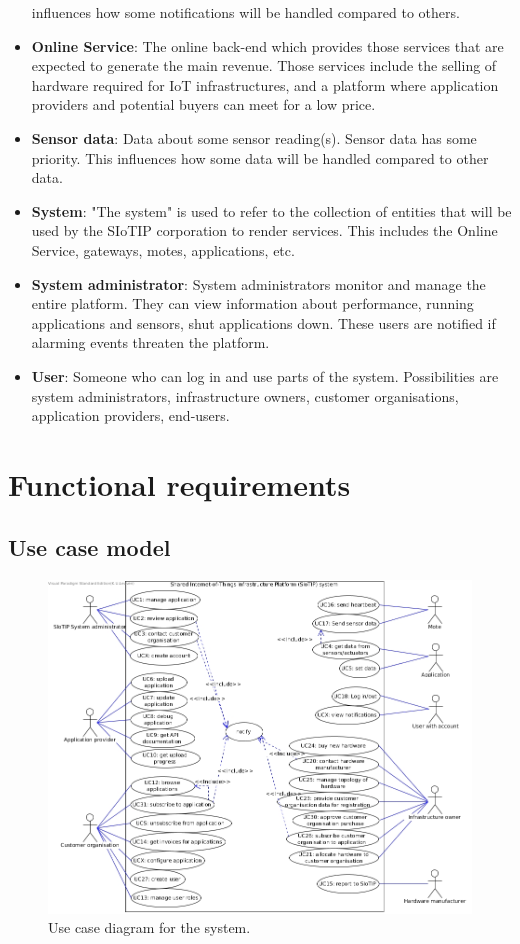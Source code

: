 \documentclass[english]{sareport}
\begin{document}
\begin{itemize}
    influences how some notifications will be handled compared to others.
    \item \textbf{Online Service}: The online back-end which provides those
    services that are expected to generate the main revenue. Those services
    include the selling of hardware required for IoT infrastructures, and a
    platform where application providers and potential buyers can meet for a low price.
    \item \textbf{Sensor data}: Data about some sensor reading(s). Sensor
    data has some priority. This influences how some data will be handled
    compared to other data.
    \item \textbf{System}: "The system" is used to refer to the collection
    of entities that will be used by the SIoTIP corporation to render services.
    This includes the Online Service, gateways, motes, applications, etc.
    \item \textbf{System administrator}: System administrators monitor and
    manage the entire platform. They can view information about performance,
    running applications and sensors, shut applications down. These users are
    notified if alarming events threaten the platform.
    \item \textbf{User}: Someone who can log in and use parts of the system.
    Possibilities are system administrators, infrastructure owners, customer
    organisations, application providers, end-users.
\end{itemize}

\chapter{Functional requirements}\label{sec:functional}
\section{Use case model}

\begin{figure}[!htp]
    \centering
    \includegraphics[width=1\textwidth]{Use_Case_Diagram1.jpg}
    \caption{Use case diagram for the system.}\label{fig:use_case_model}
\end{figure}



\end{document}
